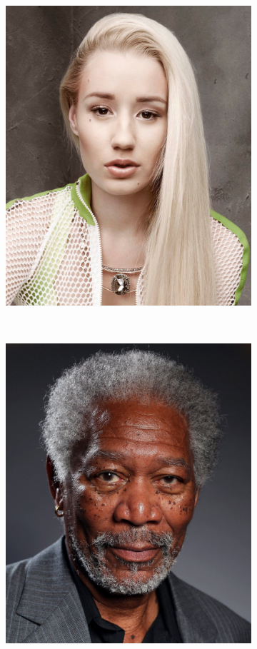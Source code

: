 \documentclass{paper}
\begin{document}
\begin{figure}[H]
    \centering
    \begin{subfigure}{0.45\textwidth}
        \includegraphics[width=\textwidth]{morph/from}
    \end{subfigure}
    ~
        \begin{subfigure}{0.45\textwidth}
        \includegraphics[width=\textwidth]{morph/to}

\end{subfigure}
\end{figure}
\end{document}
